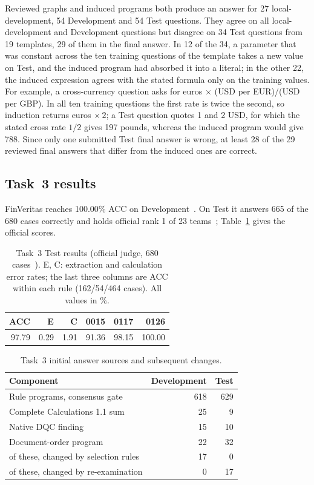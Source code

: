 \documentclass[conference]{IEEEtran}
\begin{document}
Reviewed graphs and induced programs both produce an answer for 27 local-development, 54 Development and 54 Test questions. They agree on all local-development and Development questions but disagree on 34 Test questions from 19 templates, 29 of them in the final answer. In 12 of the 34, a parameter that was constant across the ten training questions of the template takes a new value on Test, and the induced program had absorbed it into a literal; in the other 22, the induced expression agrees with the stated formula only on the training values. For example, a cross-currency question asks for euros $\times$ (USD per EUR)/(USD per GBP). In all ten training questions the first rate is twice the second, so induction returns euros $\times\,2$; a Test question quotes 1 and 2 USD, for which the stated cross rate $1/2$ gives 197 pounds, whereas the induced program would give 788. Since only one submitted Test final answer is wrong, at least 28 of the 29 reviewed final answers that differ from the induced ones are correct.

\subsection{Task~3 results}
FinVeritas reaches 100.00\% ACC on Development~\cite{task3results}. On Test it answers 665 of the 680 cases correctly and holds official rank 1 of 23 teams~\cite{task3results}; Table~\ref{tab:t3test} gives the official scores.

\begin{table}[t]
\caption{Task~3 Test results (official judge, 680 cases~\cite{task3results}). E, C: extraction and calculation error rates; the last three columns are ACC within each rule (162/54/464 cases). All values in \%.}
\label{tab:t3test}
\centering\footnotesize
\setlength{\tabcolsep}{6pt}
\begin{tabular}{@{}rrrrrr@{}}
\toprule
ACC & E & C & 0015 & 0117 & 0126\\
\midrule
97.79 & 0.29 & 1.91 & 91.36 & 98.15 & 100.00\\
\bottomrule
\end{tabular}
\end{table}

\begin{table}[t]
\caption{Task~3 initial answer sources and subsequent changes.}
\label{tab:sources}
\centering\footnotesize
\setlength{\tabcolsep}{4pt}
\begin{tabular}{@{}lrr@{}}
\toprule
Component & Development & Test\\
\midrule
Rule programs, consensus gate & 618 & 629\\
Complete Calculations 1.1 sum & 25 & 9\\
Native DQC finding & 15 & 10\\
Document-order program & 22 & 32\\
\midrule
\quad of these, changed by selection rules & 17 & 0\\
\quad of these, changed by re-examination & 0 & 17\\
\bottomrule
\end{tabular}
\end{table}
\end{document}
